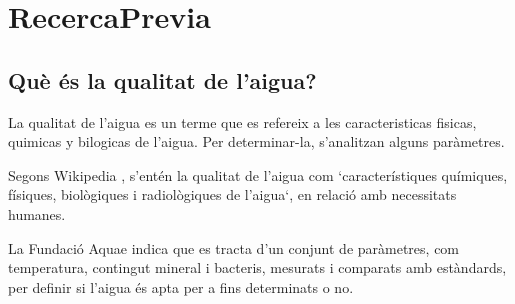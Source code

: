 \chapter{RecercaPrevia}
\label{c:RecercaPrevia}
\section{Què és la qualitat de l’aigua?}
La qualitat de l'aigua es un terme que es refereix a les caracteristicas fisicas, quimicas y bilogicas de l'aigua. Per determinar-la, s'analitzan alguns paràmetres.

Segons Wikipedia \cite{WikiAgua}, s'entén la qualitat de l'aigua com `característiques químiques, físiques, biològiques i radiològiques de l'aigua`, en relació amb necessitats humanes.

La Fundació Aquae \cite{Fundacionaquae} indica que es tracta d'un conjunt de paràmetres, com temperatura, contingut mineral i bacteris, mesurats i comparats amb estàndards, per definir si l'aigua és apta per a fins determinats o no.

